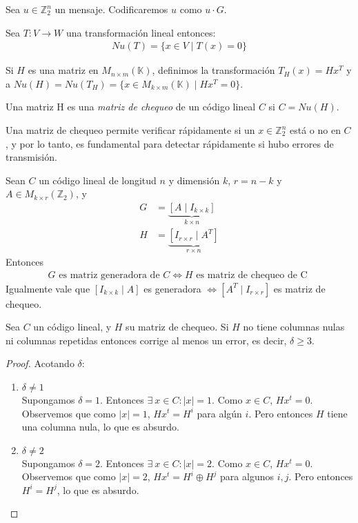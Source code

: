 \begin{definition}
Sea $u \in \mathbb{Z}_2^n$ un mensaje. Codificaremos $u$ como $u \cdot G$.
\end{definition}

\begin{proposition}
Sea $T \colon V \to W$ una transformación lineal entonces:
\begin{align}
    Nu(T) = \{x \in V \mid T(x) = 0\}
\end{align}
\end{proposition}
Si $H$ es una matriz en $M_{n \times m}(\mathbb{K})$, definimos la transformación $T_H(x) = H x^T$ y a $Nu(H) = Nu(T_H) = \{x \in M_{k \times m}(\mathbb{K}) \mid H x^T = 0\}$.

\begin{definition}
Una matriz H es una \emph{matriz de chequeo} de un código lineal $C$ si $C = Nu(H)$.

Una matriz de chequeo permite verificar rápidamente si un $x \in \mathbb{Z}_2^n$ está o no en $C$, y por lo tanto, es fundamental para detectar rápidamente si hubo errores de transmisión.
\end{definition}

\begin{theorem}
Sean $C$ un código lineal de longitud $n$ y dimensión $k$, $r = n-k$ y $A \in M_{k \times r}(\mathbb{Z}_2)$, y
\begin{align}
    G &= \underbrace{[A \mid I_{k\times k} ]}_{k\times n}\\
    H &= \underbrace{[I_{r\times r} \mid A^T]}_{r \times n}
\end{align}
Entonces
\begin{align}
    G \text{ es matriz generadora de } C \iff H \text{ es matriz de chequeo de C }
\end{align}
Igualmente vale que $[I_{k\times k} \mid A]$ es generadora $\iff [A^T \mid I_{r\times r}]$ es matriz de chequeo.
\end{theorem}

\begin{proposition}
Sea $C$ un código lineal, y $H$ su matriz de chequeo. Si $H$ no tiene columnas nulas ni columnas repetidas entonces corrige al menos un error, es decir, $\delta \ge 3$.
\end{proposition}
\begin{proof}
Acotando $\delta$:
\begin{enumerate}
    \item $\delta \neq 1$\\
    Supongamos $\delta = 1$. Entonces $\exists~ x \in C : \left| x \right| = 1$. Como $x \in C$, $Hx^t = 0$. Observemos que como $\left| x \right| = 1$, $Hx^t = H^i$ para algún $i$. Pero entonces $H$ tiene una columna nula, lo que es absurdo.
    \item $\delta \neq 2$\\
    Supongamos $\delta = 2$. Entonces $\exists~ x \in C : \left| x \right| = 2$. Como $x \in C$, $Hx^t = 0$. Observemos que como $\left| x \right| = 2$, $Hx^t = H^i \oplus H^j$ para algunos $i,j$. Pero entonces $H^i = H^j$, lo que es absurdo.
\end{enumerate}
\end{proof}


